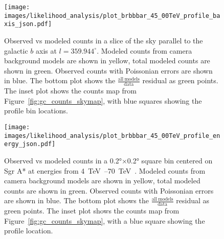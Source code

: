   \begin{figure}[t]
    \centering
    \texttt{[image: images/likelihood\_analysis/plot\_brbbbar\_45\_00TeV\_profile\_baxis\_json.pdf]}
    \caption[Galactic Center Profile vs Galactic $b$]{
      Observed vs modeled counts in a slice of the sky parallel to the galactic $b$ axis at $l=359.944^{\circ}$.
      Modeled counts from camera background models are shown in yellow, total modeled counts are shown in green.
      Observed counts with Poissonian errors are shown in blue.
      The bottom plot shows the $\frac{\mathrm{all\:models}}{\mathrm{data}}$ residual as green points.
      The inset plot shows the counts map from Figure~\ref{fig:gc_counts_skymap}, with blue squares showing the profile bin locations.
    }
    \label{fig:gc_profile_gal_b}
  \end{figure}

  
  \begin{figure}[t]
    \centering
    \texttt{[image: images/likelihood\_analysis/plot\_brbbbar\_45\_00TeV\_profile\_energy\_json.pdf]}
    \caption[Galactic Center Profile vs Energy]{
      Observed vs modeled counts in a \ang{0.2}$\times$\ang{0.2} square bin centered on Sgr A* at energies from \SIrange{4}{70}{\TeV{}}.
      Modeled counts from camera background models are shown in yellow, total modeled counts are shown in green.
      Observed counts with Poissonian errors are shown in blue.
      The bottom plot shows the $\frac{\mathrm{all\:models}}{\mathrm{data}}$ residual as green points.
      The inset plot shows the counts map from Figure~\ref{fig:gc_counts_skymap}, with a blue square showing the profile location.
      }
    \label{fig:gc_profile_energy}
  \end{figure}
  
